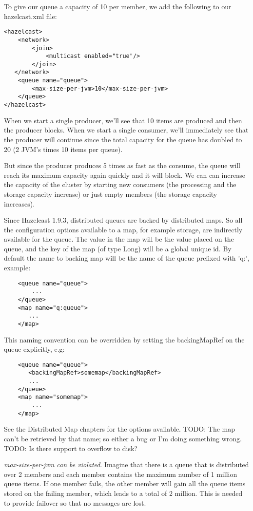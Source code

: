 To give our queue a capacity of 10 per member, we add the following to our hazelcast.xml file:
\begin{lstlisting}
<hazelcast>
    <network>
        <join>
            <multicast enabled="true"/>
        </join>
   </network>
    <queue name="queue">
        <max-size-per-jvm>10</max-size-per-jvm>
    </queue>
</hazelcast>
\end{lstlisting}
When we start a single producer, we'll see that 10 items are produced and then the producer blocks. When we start a single consumer, we'll immediately see that the producer will continue since the total capacity for the queue has doubled to 20 (2 JVM's times 10 items per queue). 

But since the producer produces 5 times as fast as the consume, the queue will reach its maximum capacity again quickly and it will block. We can can increase the capacity of the cluster by starting new consumers (the processing and the storage capacity increase) or just empty members (the storage capacity increases).

Since Hazelcast 1.9.3, distributed queues are backed by distributed maps. So all the configuration options available to a map, for example storage, are indirectly available for the queue. The value in the map will be the value placed on the queue, and the key of the map (of type Long) will be a global unique id. By default the name to backing map will be the name of the queue prefixed with 'q:', example:
\begin{lstlisting}
    <queue name="queue">
        ...
    </queue>
    <map name="q:queue">
       ...
    </map>
\end{lstlisting}

This naming convention can be overridden by setting the backingMapRef on the queue explicitly, e.g:
\begin{lstlisting}
    <queue name="queue">
       <backingMapRef>somemap</backingMapRef>
       ... 
    </queue>
    <map name="somemap">
        ...
    </map>
\end{lstlisting}
See the Distributed Map chapters for the options available.
TODO: The map can't be retrieved by that name; so either a bug or I'm doing something wrong.
TODO: Is there support to overflow to disk?

\emph{max-size-per-jvm can be violated}. Imagine that there is a queue that is distributed over 2 members and each member contains the maximum number of 1 million queue items. If one member fails, the other member will gain all the queue items stored on the failing member, which leads to a total of 2 million. This is needed to provide failover so that no messages are lost. 

